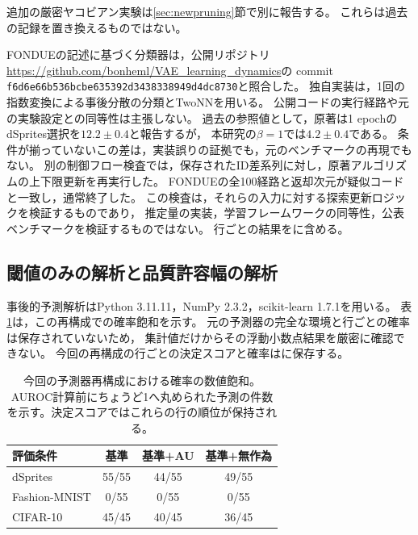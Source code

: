 \documentclass[11pt,a4paper]{ltjsarticle}
\begin{document}
追加の厳密ヤコビアン実験は\ref{sec:newpruning}節で別に報告する。
これらは過去の記録を置き換えるものではない。

FONDUEの記述に基づく分類器は，公開リポジトリ
\url{https://github.com/bonheml/VAE_learning_dynamics}の
commit \texttt{f6d6e66b536bcbe635392d3438338949d4dc8730}と照合した。
独自実装は，1回の指数変換による事後分散の分類とTwoNNを用いる。
公開コードの実行経路や元の実験設定との同等性は主張しない。
過去の参照値として，原著は1 epochのdSprites選択を$12.2\pm0.4$と報告する\cite{bonheme2022fondue}が，
本研究の$\beta=1$では$4.2\pm0.4$である。
条件が揃っていないこの差は，実装誤りの証拠でも，元のベンチマークの再現でもない。
別の制御フロー検査では，保存されたID差系列に対し，原著アルゴリズムの上下限更新を再実行した。
FONDUEの全100経路と返却次元が疑似コードと一致し，通常終了した。
この検査は，それらの入力に対する探索更新ロジックを検証するものであり，
推定量の実装，学習フレームワークの同等性，公表ベンチマークを検証するものではない。
行ごとの結果をに含める。

\subsection{閾値のみの解析と品質許容幅の解析}\label{app:sensitivity}
事後的予測解析はPython 3.11.11，NumPy 2.3.2，scikit-learn 1.7.1を用いる。
表\ref{tab:saturation}は，この再構成での確率飽和を示す。
元の予測器の完全な環境と行ごとの確率は保存されていないため，
集計値だけからその浮動小数点結果を厳密に確認できない。
今回の再構成の行ごとの決定スコアと確率はに保存する。
\begin{table}[H]
\caption{今回の予測器再構成における確率の数値飽和。AUROC計算前にちょうど1へ丸められた予測の件数を示す。決定スコアではこれらの行の順位が保持される。}\label{tab:saturation}
\small
\setlength{\tabcolsep}{3.5pt}
\begin{tabular*}{\textwidth}{@{\extracolsep{\fill}}lccc@{}}
\toprule
評価条件 & 基準 & 基準+AU & 基準+無作為 \\
\midrule
dSprites & 55/55 & 44/55 & 49/55 \\
Fashion-MNIST & 0/55 & 0/55 & 0/55 \\
CIFAR-10 & 45/45 & 40/45 & 36/45 \\
\bottomrule
\end{tabular*}
\end{table}
\end{document}
